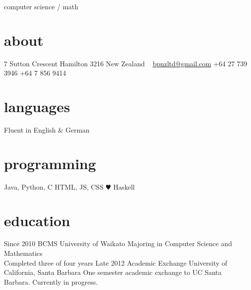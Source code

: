\documentclass[]{boris-cv}
\begin{document}
       {computer science / math}

\begin{aside}
  \section{about}
    7 Sutton Crescent
    Hamilton 3216
    New Zealand
    ~
    \href{mailto:bpnzltd@gmail.com}{bpnzltd@gmail.com}
    +64 27 739 3946
    +64 7 856 9414
  \section{languages}
    Fluent in 
    English \& German
  \section{programming}
    Java, Python, C
    HTML, JS, CSS
    {\color{red} $\varheartsuit$} Haskell
\end{aside}

%
%
%
\section{education}

\begin{entrylist}
  \entry
    {Since 2010}
    {BCMS }
    {University of Waikato}
    {Majoring in Computer Science and Mathematics\\Completed three of four years}
  \entry
    {Late 2012}
    {Academic Exchange}
    {University of California, Santa Barbara}
    {One semester academic exchange to UC Santa Barbara. Currently in progress.}
\end{entrylist}
\end{document}

